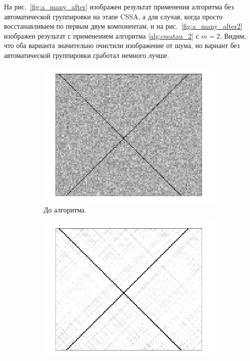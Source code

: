 \documentclass[specialist,
               substylefile = spbu.rtx,
               subf,href,colorlinks=true, 12pt]{disser}
\begin{document}
На рис.~\ref{fig:a_many_after} изображен результат применения алгоритма без автоматической группировки на этапе CSSA, а для случая, когда просто восстанавливаем по первым двум компонентам, и на рис.~\ref{fig:a_many_after2} изображен результат с применением алгоритма \ref{alg:cssatau_2} с $m=2$. Видим, что оба варианта значительно очистили изображение от шума, но вариант без автоматической группировки сработал немного лучше.
\begin{figure}[hhh!]
        \centering
    \begin{subfigure}[b]{0.32\textwidth}
        \includegraphics[width=\textwidth]{lines_noise}
        \caption{До алгоритма.}
        \label{fig:a_many_before}
    \end{subfigure}
        \quad
    \begin{subfigure}[b]{0.32\textwidth}
       \includegraphics[width=\textwidth]{noauto_lines}

\end{subfigure}
\end{figure}
\end{document}
